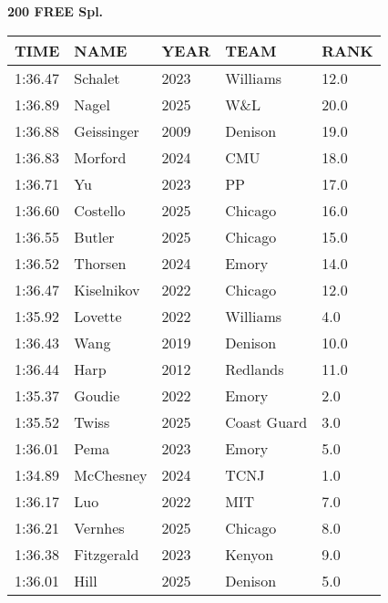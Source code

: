 \begin{center}
\begin{minipage}[t]{0.7\textwidth}
\centering
\textbf{200 FREE Spl.}\\[0.05cm]
\begin{tabular}{@{}p{1.8cm}p{2.8cm}p{1.2cm}p{1.4cm}p{0.8cm}@{}}
\hline
\textbf{TIME} & \textbf{NAME} & \textbf{YEAR} & \textbf{TEAM} & \textbf{RANK} \\
\hline
1:36.47 & Schalet & 2023 & Williams & 12.0 \\
1:36.89 & Nagel & 2025 & W\&L & 20.0 \\
1:36.88 & Geissinger & 2009 & Denison & 19.0 \\
1:36.83 & Morford & 2024 & CMU & 18.0 \\
1:36.71 & Yu & 2023 & PP & 17.0 \\
1:36.60 & Costello & 2025 & Chicago & 16.0 \\
1:36.55 & Butler & 2025 & Chicago & 15.0 \\
1:36.52 & Thorsen & 2024 & Emory & 14.0 \\
1:36.47 & Kiselnikov & 2022 & Chicago & 12.0 \\
1:35.92 & Lovette & 2022 & Williams & 4.0 \\
1:36.43 & Wang & 2019 & Denison & 10.0 \\
1:36.44 & Harp & 2012 & Redlands & 11.0 \\
1:35.37 & Goudie & 2022 & Emory & 2.0 \\
1:35.52 & Twiss & 2025 & Coast Guard & 3.0 \\
1:36.01 & Pema & 2023 & Emory & 5.0 \\
1:34.89 & McChesney & 2024 & TCNJ & 1.0 \\
1:36.17 & Luo & 2022 & MIT & 7.0 \\
1:36.21 & Vernhes & 2025 & Chicago & 8.0 \\
1:36.38 & Fitzgerald & 2023 & Kenyon & 9.0 \\
1:36.01 & Hill & 2025 & Denison & 5.0 \\
\hline
\end{tabular}
\end{minipage}
\end{center}

\vspace{0.4cm}

